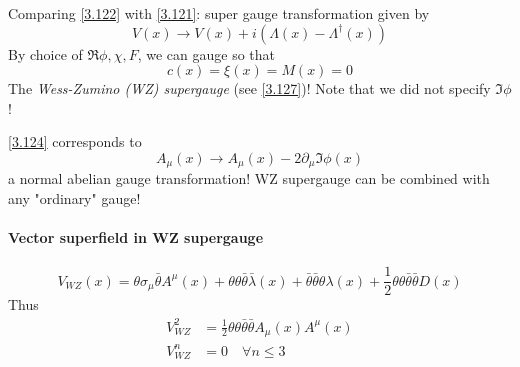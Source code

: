 Comparing \eqref{3.122} with \eqref{3.121}: super gauge transformation given by
\begin{equation}
   V(x) \rightarrow V(x) + i (\Lambda(x) - \Lambda^\dagger(x)) \label{3.124}
\end{equation}
By choice of $\Re \phi, \chi, F$, we can gauge so that
\begin{equation}
   c(x) = \xi(x) = M(x) = 0 \label{3.125}
\end{equation}
The \textit{Wess-Zumino (WZ) supergauge} (see \eqref{3.127})! Note that we did not specify $\Im \phi$! 

\eqref{3.124} corresponds to 
\begin{equation}
   A_\mu (x) \rightarrow A_\mu (x) - 2 \partial_\mu \Im \phi (x) \label{3.126}
\end{equation}
a normal abelian gauge transformation! WZ supergauge can be combined with any "ordinary" gauge! 

\paragraph{Vector superfield in WZ supergauge}
\begin{equation}
   V_{WZ}(x) = \theta \sigma_\mu \bar\theta A^\mu (x) + \theta \theta \bar\theta \bar\lambda(x) + \bar\theta \bar\theta \theta \lambda(x) + \frac{1}{2} \theta\theta \bar\theta \bar\theta D(x) \label{3.127}
\end{equation}
Thus
\begin{subequations}
   \label{3.128}
\begin{align}
   V^2_{WZ} &= \frac{1}{2} \theta \theta \bar\theta \bar\theta A_\mu (x) A^\mu (x) \label{3.128a} \\
   V^n_{WZ} &= 0 \quad \forall n \leq 3 \label{3.128b}
\end{align}
\end{subequations}

